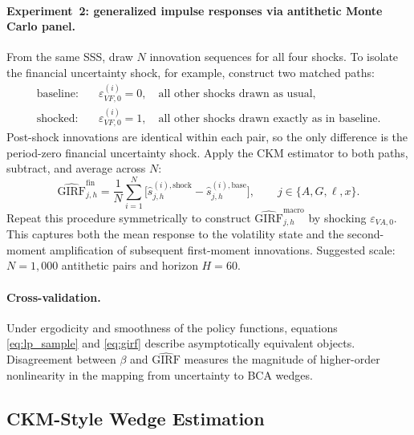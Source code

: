 \paragraph{Experiment~2: generalized impulse responses via antithetic Monte Carlo panel.}
From the same SSS, draw \(N\) innovation sequences for all four shocks.
To isolate the financial uncertainty shock, for example, construct two matched paths:
\begin{align}
    \text{baseline:}\quad
    & \varepsilon_{VF,0}^{(i)}=0,
      \quad
      \text{all other shocks drawn as usual},
    \\
    \text{shocked:}\quad
    & \varepsilon_{VF,0}^{(i)}=1,
      \quad
      \text{all other shocks drawn exactly as in baseline}.
\end{align}
Post-shock innovations are identical within each pair, so the only difference
is the period-zero financial uncertainty shock. Apply the CKM estimator to both
paths, subtract, and average across \(N\):
\begin{equation}
    \widehat{\mathrm{GIRF}}^{\text{fin}}_{j,h}
    =
    \frac{1}{N}\sum_{i=1}^{N}
    \Big[
        \widehat{s}^{(i),\text{shock}}_{j,h}
        -
        \widehat{s}^{(i),\text{base}}_{j,h}
    \Big],
    \qquad
    j\in\{A,G,\ell,x\}.
    \label{eq:girf}
\end{equation}
Repeat this procedure symmetrically to construct \(\widehat{\mathrm{GIRF}}^{\text{macro}}_{j,h}\)
by shocking \(\varepsilon_{VA,0}\). This captures both the mean response to the
volatility state and the second-moment amplification of subsequent first-moment
innovations. Suggested scale: \(N=1{,}000\) antithetic pairs and horizon \(H=60\).

\paragraph{Cross-validation.}
Under ergodicity and smoothness of the policy functions, equations
\eqref{eq:lp_sample} and \eqref{eq:girf} describe asymptotically equivalent
objects. Disagreement between \(\beta\) and \(\widehat{\mathrm{GIRF}}\)
measures the magnitude of higher-order nonlinearity in the mapping from uncertainty
to BCA wedges.

\subsection{CKM-Style Wedge Estimation}
\label{subsec:ckm_estimator}

